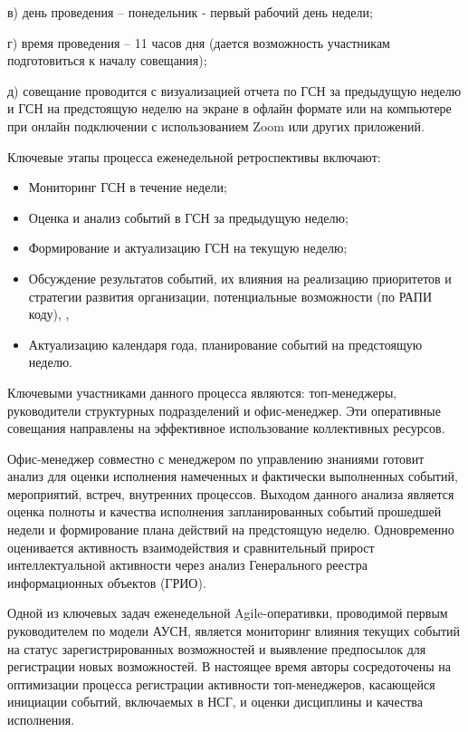 \begin{multicols}{2}
в) день проведения -- понедельник - первый рабочий день недели;

г) время проведения -- 11 часов дня (дается возможность участникам
подготовиться к началу совещания);

д) совещание проводится с визуализацией отчета по ГСН за предыдущую
неделю и ГСН на предстоящую неделю на экране в офлайн формате или на
компьютере при онлайн подключении с использованием Zoom или других
приложений.

Ключевые этапы процесса еженедельной ретроспективы включают:

\begin{itemize}[left=0.5cm]
\item
  Мониторинг ГСН в течение недели;
\item
  Оценка и анализ событий в ГСН за предыдущую неделю;
\item
  Формирование и актуализацию ГСН на текущую неделю;
\item
  Обсуждение результатов событий, их влияния на реализацию приоритетов и
  стратегии развития организации, потенциальные возможности (по РАПИ
  коду), ,
\item
  Актуализацию календаря года, планирование событий на предстоящую
  неделю.
\end{itemize}

Ключевыми участниками данного процесса являются: топ-менеджеры,
руководители структурных подразделений и офис-менеджер. Эти оперативные
совещания направлены на эффективное использование коллективных ресурсов.

Офис-менеджер совместно с менеджером по управлению знаниями готовит
анализ для оценки исполнения намеченных и фактически выполненных
событий, мероприятий, встреч, внутренних процессов. Выходом данного
анализа является оценка полноты и качества исполнения запланированных
событий прошедшей недели и формирование плана действий на предстоящую
неделю. Одновременно оценивается активность взаимодействия и
сравнительный прирост интеллектуальной активности через анализ
Генерального реестра информационных объектов (ГРИО).

Одной из ключевых задач еженедельной Agile-оперативки, проводимой первым
руководителем по модели АУСН, является мониторинг влияния текущих
событий на статус зарегистрированных возможностей и выявление
предпосылок для регистрации новых возможностей. В настоящее время авторы
сосредоточены на оптимизации процесса регистрации активности
топ-менеджеров, касающейся инициации событий, включаемых в НСГ, и оценки
дисциплины и качества исполнения.


\end{multicols}
